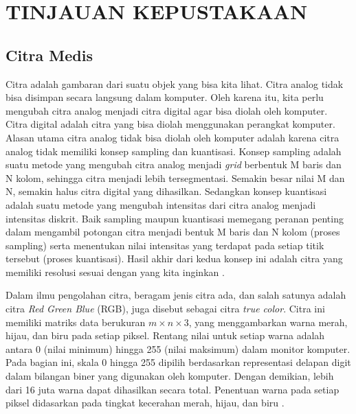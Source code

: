 \chapter{TINJAUAN KEPUSTAKAAN}






\section{Citra Medis}


\par Citra adalah gambaran dari suatu objek yang bisa kita lihat. Citra analog tidak bisa disimpan secara langsung dalam komputer. Oleh karena itu, kita perlu mengubah citra analog menjadi citra digital agar bisa diolah oleh komputer. Citra digital adalah citra yang bisa diolah menggunakan perangkat komputer. Alasan utama citra analog tidak bisa diolah oleh komputer adalah karena citra analog tidak memiliki konsep sampling dan kuantisasi. Konsep sampling adalah suatu metode yang mengubah citra analog menjadi \textit{grid} berbentuk M baris dan N kolom, sehingga citra menjadi lebih tersegmentasi. Semakin besar nilai M dan N, semakin halus citra digital yang dihasilkan. Sedangkan konsep kuantisasi adalah suatu metode yang mengubah intensitas dari citra analog menjadi intensitas diskrit. Baik sampling maupun kuantisasi memegang peranan penting dalam mengambil potongan citra menjadi bentuk M baris dan N kolom (proses sampling) serta menentukan nilai intensitas yang terdapat pada setiap titik tersebut (proses kuantisasi). Hasil akhir dari kedua konsep ini adalah citra yang memiliki resolusi sesuai dengan yang kita inginkan \citep{andono2018pengolahan}.

\par Dalam ilmu pengolahan citra, beragam jenis citra ada, dan salah satunya adalah citra \textit{Red Green Blue} (RGB), juga disebut sebagai citra \textit{true color}. Citra ini memiliki matriks data berukuran $m \times n \times 3$, yang menggambarkan warna merah, hijau, dan biru pada setiap piksel. Rentang nilai untuk setiap warna adalah antara 0 (nilai minimum) hingga 255 (nilai maksimum) dalam monitor komputer. Pada bagian ini, skala 0 hingga 255 dipilih berdasarkan representasi delapan digit dalam bilangan biner yang digunakan oleh komputer. Dengan demikian, lebih dari 16 juta warna dapat dihasilkan secara total. Penentuan warna pada setiap piksel didasarkan pada tingkat kecerahan merah, hijau, dan biru \citep{ardiansyah2013pengenalan}.

